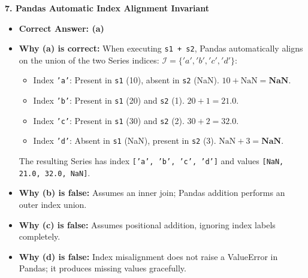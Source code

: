 \textbf{7. Pandas Automatic Index Alignment Invariant}
\begin{itemize}
    \item \textbf{Correct Answer: (a)}
    \item \textbf{Why (a) is correct:}
    When executing \texttt{s1 + s2}, Pandas automatically aligns on the union of the two Series indices: $\mathcal{I} = \{'a', 'b', 'c', 'd'\}$:
    \begin{itemize}
        \item Index \texttt{'a'}: Present in \texttt{s1} (10), absent in \texttt{s2} (NaN). $10 + \text{NaN} = \mathbf{\text{NaN}}$.
        \item Index \texttt{'b'}: Present in \texttt{s1} (20) and \texttt{s2} (1). $20 + 1 = \mathbf{21.0}$.
        \item Index \texttt{'c'}: Present in \texttt{s1} (30) and \texttt{s2} (2). $30 + 2 = \mathbf{32.0}$.
        \item Index \texttt{'d'}: Absent in \texttt{s1} (NaN), present in \texttt{s2} (3). $\text{NaN} + 3 = \mathbf{\text{NaN}}$.
    \end{itemize}
    The resulting Series has index \texttt{['a', 'b', 'c', 'd']} and values \texttt{[NaN, 21.0, 32.0, NaN]}.
    \item \textbf{Why (b) is false:} Assumes an inner join; Pandas addition performs an outer index union.
    \item \textbf{Why (c) is false:} Assumes positional addition, ignoring index labels completely.
    \item \textbf{Why (d) is false:} Index misalignment does not raise a ValueError in Pandas; it produces missing values gracefully.
\end{itemize}












